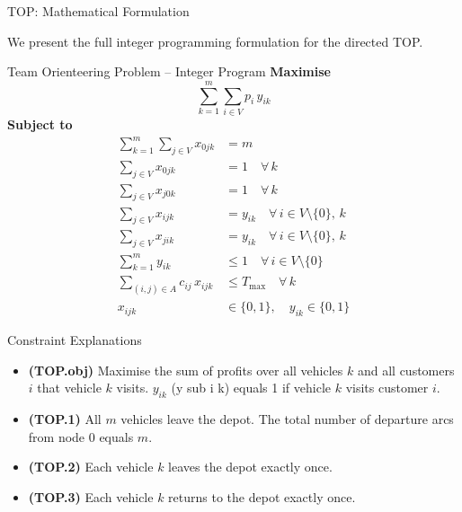 \documentclass[aspectratio=169,10pt]{beamer}
\begin{document}
\begin{frame}[allowframebreaks]{TOP: Mathematical Formulation}

  We present the full integer programming formulation for the directed TOP.

  \medskip
  \begin{block}{Team Orienteering Problem -- Integer Program}
    \textbf{Maximise}
    \[
      \sum_{k=1}^{m} \sum_{i \in V} p_i \, y_{ik}
      \tag{TOP.obj}
    \]
    \textbf{Subject to}
    \begin{align}
      \sum_{k=1}^{m} \sum_{j \in V} x_{0jk} &= m
      \tag{TOP.1}\\
      \sum_{j \in V} x_{0jk} &= 1
      \quad \forall\, k
      \tag{TOP.2}\\
      \sum_{j \in V} x_{j0k} &= 1
      \quad \forall\, k
      \tag{TOP.3}\\
      \sum_{j \in V} x_{ijk} &= y_{ik}
      \quad \forall\, i \in V \setminus\{0\},\, k
      \tag{TOP.4}\\
      \sum_{j \in V} x_{jik} &= y_{ik}
      \quad \forall\, i \in V \setminus\{0\},\, k
      \tag{TOP.5}\\
      \sum_{k=1}^{m} y_{ik} &\le 1
      \quad \forall\, i \in V \setminus\{0\}
      \tag{TOP.6}\\
      \sum_{(i,j) \in A} c_{ij} \, x_{ijk} &\le T_{\max}
      \quad \forall\, k
      \tag{TOP.7}\\
      x_{ijk} &\in \{0,1\},\quad y_{ik} \in \{0,1\}
      \tag{TOP.8}
    \end{align}
  \end{block}

  \framebreak

  \begin{block}{Constraint Explanations}
    \begin{itemize}
      \item \textbf{(TOP.obj)} Maximise the sum of profits over all vehicles
            $k$ and all customers $i$ that vehicle $k$ visits.
            $y_{ik}$ (y sub i k) equals 1 if vehicle $k$ visits customer $i$.

      \item \textbf{(TOP.1)} All $m$ vehicles leave the depot.
            The total number of departure arcs from node 0 equals $m$.

      \item \textbf{(TOP.2)} Each vehicle $k$ leaves the depot exactly once.

      \item \textbf{(TOP.3)} Each vehicle $k$ returns to the depot exactly once.


\end{itemize}
\end{block}
\end{frame}
\end{document}
